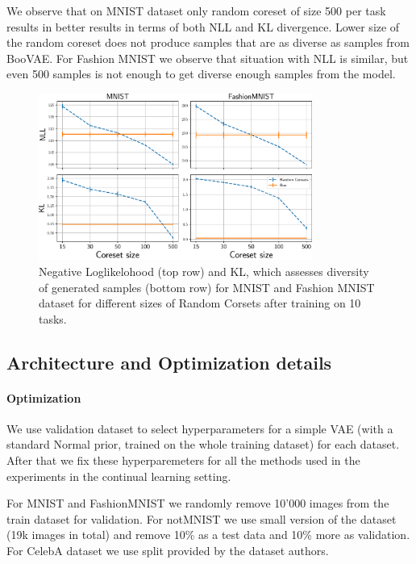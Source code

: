 We observe that on MNIST dataset only random coreset of size 500 per task results in better results in terms of both NLL and KL divergence. Lower size of the random coreset does not produce samples that are as diverse as samples from BooVAE.  For Fashion MNIST we observe that situation with NLL is similar, but even 500 samples is not enough to get diverse enough samples from the model.

\begin{figure}[ht]
		\centering
		\includegraphics[width=0.8\textwidth]{pics/1_boovae/coresets_mnist.pdf}
		\caption{Negative Loglikelohood (top row) and KL, which assesses diversity of generated samples (bottom row) for MNIST and Fashion MNIST dataset for different sizes of Random Corsets after training on 10 tasks.}
		\label{fig:coresets}
\end{figure}

\newpage
\subsection{Architecture and Optimization details}\label{app:archicture}
\paragraph{Optimization} 
We use validation dataset to select hyperparameters for a simple VAE (with a standard Normal prior, trained on the whole training dataset) for each dataset. After that we fix these hyperparemeters for all the methods used in the experiments in the continual learning setting. 

For MNIST and FashionMNIST we randomly remove 10'000 images from the train dataset for validation. For notMNIST we use small version of the dataset (19k images in total) and remove 10\% as a test data and 10\% more as validation. For CelebA dataset we use split provided by the dataset authors. 

